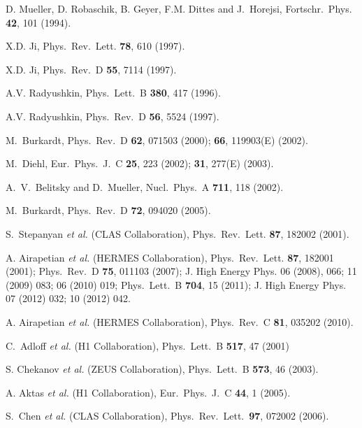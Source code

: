 \documentclass[twocolumn,nofootinbib,prl,superscriptaddress,secnumarabic,amssymb,nobibnotes,aps,floatfix]{revtex4}
\begin{document}
\begin{thebibliography}{99}

D. Mueller, D. Robaschik, B. Geyer, F.M. Dittes and J.~Horejsi,
Fortschr.\ Phys. {\bf 42}, 101 (1994).
  
X.D. Ji,
Phys.\ Rev.\ Lett. {\bf 78}, 610 (1997).

X.D. Ji,
Phys.\ Rev.\ D {\bf 55}, 7114 (1997).

A.V. Radyushkin,
Phys.\ Lett.\  B {\bf 380}, 417 (1996).

A.V. Radyushkin,
Phys.\ Rev.\ D {\bf 56}, 5524 (1997).

  M.~Burkardt,
  Phys.\ Rev.\ D {\bf 62}, 071503 (2000); {\bf 66}, 119903(E) (2002).

  M.~Diehl,
  Eur.\ Phys.\ J.\ C {\bf 25}, 223 (2002); {\bf 31}, 277(E) (2003).
 
  A.~V.~Belitsky and D.~Mueller,
  Nucl.\ Phys.\ A {\bf 711}, 118 (2002).

  M.~Burkardt,
  Phys.\ Rev.\ D {\bf 72}, 094020 (2005).

   S.~Stepanyan {\it et al.} (CLAS Collaboration),
Phys.\ Rev.\ Lett. {\bf 87}, 182002 (2001).

   A. Airapetian {\it et al.} (HERMES Collaboration),
Phys.\ Rev.\ Lett. {\bf 87}, 182001 (2001);
Phys.\ Rev.\  D {\bf 75}, 011103 (2007);
J. High Energy Phys. 06 (2008), 066; 11 (2009) 083;
06 (2010) 019;
Phys.\ Lett.\ B {\bf 704}, 15 (2011);
J. High Energy Phys. 07 (2012) 032; 10 (2012) 042.

   A. Airapetian {\it et al.} (HERMES Collaboration),
Phys.\ Rev.\ C {\bf 81}, 035202 (2010).

 C.~Adloff {\it et al.} (H1 Collaboration),
  Phys.\ Lett.\ B {\bf 517}, 47 (2001)

   S. Chekanov {\it et al.} (ZEUS Collaboration),
Phys.\ Lett.\  B {\bf 573}, 46 (2003).

   A. Aktas {\it et al.} (H1 Collaboration),
Eur.\ Phys.\ J.\ C {\bf 44}, 1 (2005).

 S.~Chen {\it et al.} (CLAS Collaboration),
Phys.\ Rev.\ Lett.\ {\bf 97}, 072002 (2006).


\end{thebibliography}
\end{document}
